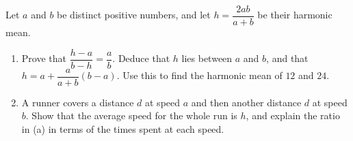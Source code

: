 Let $a$ and $b$ be distinct positive numbers, and let $h=\dfrac{2ab}{a+b}$ be their harmonic mean.
\begin{enumerate}
\item[(a)] Prove that $\dfrac{h-a}{b-h}=\dfrac ab$. Deduce that $h$ lies between $a$ and $b$, and that $h=a+\dfrac{a}{a+b}(b-a)$. Use this to find the harmonic mean of $12$ and $24$.
\item[(b)] A runner covers a distance $d$ at speed $a$ and then another distance $d$ at speed $b$. Show that the average speed for the whole run is $h$, and explain the ratio in (a) in terms of the times spent at each speed.
\end{enumerate}
